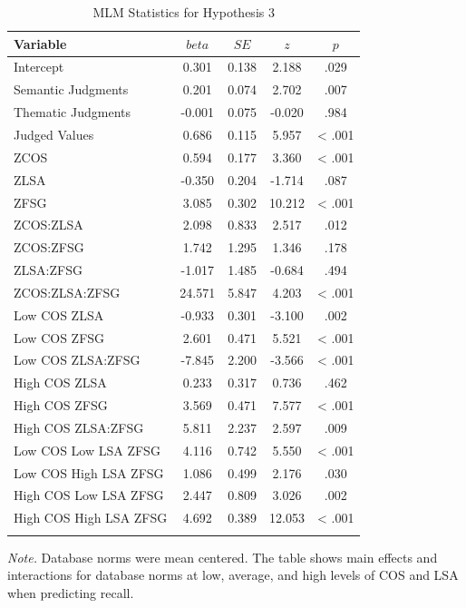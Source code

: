 \documentclass[english,man]{apa6}
\theoremstyle{definition}
\theoremstyle{definition}
\theoremstyle{remark}
\begin{document}
\begin{table}[tbp]
\begin{center}
\begin{threeparttable}
\caption{\label{tab:hyp3-table}MLM Statistics for Hypothesis 3}
\small{
\begin{tabular}{lcccc}
\toprule
Variable & \multicolumn{1}{c}{$beta$} & \multicolumn{1}{c}{$SE$} & \multicolumn{1}{c}{$z$} & \multicolumn{1}{c}{$p$}\\
\midrule
Intercept & 0.301 & 0.138 & 2.188 & .029\\
Semantic Judgments & 0.201 & 0.074 & 2.702 & .007\\
Thematic Judgments & -0.001 & 0.075 & -0.020 & .984\\
Judged Values & 0.686 & 0.115 & 5.957 & < .001\\
ZCOS & 0.594 & 0.177 & 3.360 & < .001\\
ZLSA & -0.350 & 0.204 & -1.714 & .087\\
ZFSG & 3.085 & 0.302 & 10.212 & < .001\\
ZCOS:ZLSA & 2.098 & 0.833 & 2.517 & .012\\
ZCOS:ZFSG & 1.742 & 1.295 & 1.346 & .178\\
ZLSA:ZFSG & -1.017 & 1.485 & -0.684 & .494\\
ZCOS:ZLSA:ZFSG & 24.571 & 5.847 & 4.203 & < .001\\
Low COS ZLSA & -0.933 & 0.301 & -3.100 & .002\\
Low COS ZFSG & 2.601 & 0.471 & 5.521 & < .001\\
Low COS ZLSA:ZFSG & -7.845 & 2.200 & -3.566 & < .001\\
High COS ZLSA & 0.233 & 0.317 & 0.736 & .462\\
High COS ZFSG & 3.569 & 0.471 & 7.577 & < .001\\
High COS ZLSA:ZFSG & 5.811 & 2.237 & 2.597 & .009\\
Low COS Low LSA ZFSG & 4.116 & 0.742 & 5.550 & < .001\\
Low COS High LSA ZFSG & 1.086 & 0.499 & 2.176 & .030\\
High COS Low LSA ZFSG & 2.447 & 0.809 & 3.026 & .002\\
High COS High LSA ZFSG & 4.692 & 0.389 & 12.053 & < .001\\
\bottomrule
\addlinespace
\end{tabular}
}
\begin{tablenotes}[para]
\textit{Note.} Database norms were mean centered. The table shows main effects and interactions for database norms at low, average, and high levels of COS and LSA when predicting recall.
\end{tablenotes}
\end{threeparttable}
\end{center}
\end{table}
\end{document}
